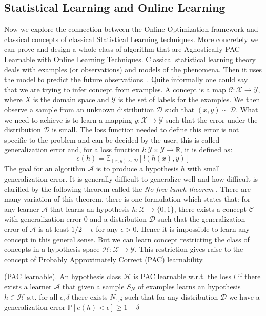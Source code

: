 \subsection{Statistical Learning and Online Learning}
Now we explore the connection between the Online Optimization framework and classical concepts of classical Statistical Learning techniques. More concretely we can prove and design a whole class of algorithm that are Agnostically PAC Learnable with Online Learning Techniques.
Classical statistical learning theory deals with examples (or observations) and models of the phenomena. Then it uses the model to predict the future observations~\cite{bousquet2003introduction}. Quite informally one could say that we are trying to infer concept from examples. A concept is a map $\mathcal C:\mathcal X\to\mathcal Y$, where $X$ is the domain space and $\mathcal Y$ is the set of labels for the examples. We then observe a sample from an unknown distribution $\mathcal D$ such that $(x,y)\sim \mathcal D$. What we need to achieve is to learn a mapping $y:\mathcal X\to\mathcal Y$ such that the error under the distribution $\mathcal D$ is small. The loss function needed to define this error is not specific to the problem and can be decided by the user, this is called generalization error and, for a loss function $l:\mathcal Y\times\mathcal Y \to\mathbb R$, it is defined as:
\begin{equation}\label{eq:generalization}
    e(h) = \mathbb E_{(x,y)\sim \mathcal D}[l(h(x),y)]
\end{equation}
The goal for an algorithm $\mathcal A$ is to produce a hypothesis $h$ with small generalization error. 
It is generally difficult to generalize well and how difficult is clarified by the following theorem called the \emph{No free lunch theorem} . There are many variation of this theorem, there is one formulation which states that: for any learner $\mathcal A$ that learns an hypothesis $h:\mathcal X\to \{0,1\}$, there exists a concept $\mathcal C$ with generalization error $0$ and a distribution $\mathcal D$ such that the generalization error of $\mathcal A$ is at least $1/2-\epsilon$ for any $\epsilon>0$. Hence it is impossible to learn any concept in this general sense. But we can learn concept restricting the class of concepts in a hypothesis space $\mathcal H:\mathcal X\to\mathcal Y$.
This restriction gives raise to the concept of Probably Approximately Correct (PAC) learnability. 

\begin{definition}(PAC learnable).\label{def:PAC}
    An hypothesis class $\mathcal H$ is PAC learnable w.r.t. the loss $l$ if there exists a learner $\mathcal A$ that given a sample $S_N$ of examples learns an hypothesis $h\in\mathcal H$ s.t. for all $\epsilon,\delta$ there exists $N_{\epsilon,\delta}$ such that for any distribution $\mathcal D$ we have a generalization error $\mathbb P[e(h)<\epsilon]\ge1-\delta$
\end{definition}

